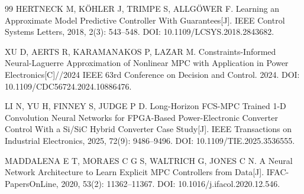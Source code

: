 \documentclass[UTF8,fontset=fandol,a4paper,twocolumn,10pt]{ctexart}
\begin{document}
\begin{thebibliography}{99}
 HERTNECK M, KÖHLER J, TRIMPE S, ALLGÖWER F. Learning an Approximate Model Predictive Controller With Guarantees[J]. IEEE Control Systems Letters, 2018, 2(3): 543–548. DOI: 10.1109/LCSYS.2018.2843682.

 XU D, AERTS R, KARAMANAKOS P, LAZAR M. Constraints-Informed Neural-Laguerre Approximation of Nonlinear MPC with Application in Power Electronics[C]//2024 IEEE 63rd Conference on Decision and Control. 2024. DOI: 10.1109/CDC56724.2024.10886476.

 LI N, YU H, FINNEY S, JUDGE P D. Long-Horizon FCS-MPC Trained 1-D Convolution Neural Networks for FPGA-Based Power-Electronic Converter Control With a Si/SiC Hybrid Converter Case Study[J]. IEEE Transactions on Industrial Electronics, 2025, 72(9): 9486–9496. DOI: 10.1109/TIE.2025.3536555.

 MADDALENA E T, MORAES C G S, WALTRICH G, JONES C N. A Neural Network Architecture to Learn Explicit MPC Controllers from Data[J]. IFAC-PapersOnLine, 2020, 53(2): 11362–11367. DOI: 10.1016/j.ifacol.2020.12.546.

\end{thebibliography}
\end{document}
